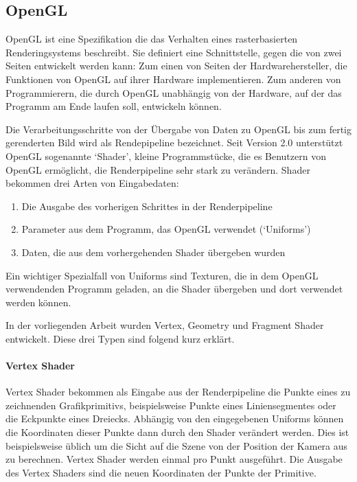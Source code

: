 \documentclass[a4paper,fontsize=12pt,toc=bib,halfparskip]{scrartcl}
\begin{document}
\subsection{OpenGL}
OpenGL\cite{openglWebsite} ist eine Spezifikation die das Verhalten eines rasterbasierten Renderingsystems beschreibt. Sie definiert eine Schnittstelle, gegen die von zwei Seiten entwickelt werden kann: Zum einen von Seiten der Hardwarehersteller, die Funktionen von OpenGL auf ihrer Hardware implementieren. Zum anderen von Programmierern, die durch OpenGL unabh\"angig von der Hardware, auf der das Programm am Ende laufen soll, entwickeln k\"onnen. 

Die Verarbeitungsschritte von der \"Ubergabe von Daten zu OpenGL bis zum fertig gerenderten Bild wird als Rendepipeline bezeichnet. Seit Version 2.0 unterst\"utzt OpenGL sogenannte `Shader', kleine Programmst\"ucke, die es Benutzern von OpenGL erm\"oglicht, die Renderpipeline sehr stark zu ver\"andern. Shader bekommen drei Arten von Eingabedaten:

\begin{enumerate}
	\item Die Ausgabe des vorherigen Schrittes in der Renderpipeline
	\item Parameter aus dem Programm, das OpenGL verwendet (`Uniforms')
	\item Daten, die aus dem vorhergehenden Shader \"ubergeben wurden
\end{enumerate}

Ein wichtiger Spezialfall von Uniforms sind Texturen, die in dem OpenGL verwendenden Programm geladen, an die Shader \"ubergeben und dort verwendet werden k\"onnen.

In der vorliegenden Arbeit wurden Vertex, Geometry und Fragment Shader entwickelt. Diese drei Typen sind folgend kurz erkl\"art.

\paragraph{Vertex Shader}
Vertex Shader bekommen als Eingabe aus der Renderpipeline die Punkte eines zu zeichnenden Grafikprimitivs, beispielsweise Punkte eines Liniensegmentes oder die Eckpunkte eines Dreiecks. Abh\"angig von den eingegebenen Uniforms k\"onnen die Koordinaten dieser Punkte dann durch den Shader ver\"andert werden. Dies ist beispielsweise \"ublich um die Sicht auf die Szene von der Position der Kamera aus zu berechnen. Vertex Shader werden einmal pro Punkt ausgef\"uhrt. Die Ausgabe des Vertex Shaders sind die neuen Koordinaten der Punkte der Primitive.
\end{document}

